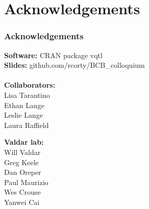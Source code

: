 \documentclass{beamer}
\begin{document}
\section*{Acknowledgements}
\begin{frame}\frametitle{Acknowledgements}
    \begin{minipage}{0.45\textwidth}
        {\small
        \textbf{Software:} CRAN package vqtl\\
        \textbf{Slides:} github.com/rcorty/BCB\_colloquium\\\\
        \textbf{Collaborators:}\\
        Lisa Tarantino\\
        Ethan Lange\\
        Leslie Lange\\
        Laura Raffield}
    \end{minipage}\hfill
    \begin{minipage}{0.45\textwidth}
        {\small
        \textbf{Valdar lab:}\\
        Will Valdar\\
        Greg Keele\\
        Dan Oreper\\
        Paul Maurizio\\
        Wes Crouse\\
        Yanwei Cai}
    \end{minipage}
\end{frame}
\end{document}
